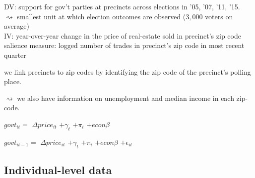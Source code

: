 \documentclass[10pt,aspectratio=169]{beamer}
\begin{document}
\begin{frame}
DV: support for gov't parties at precincts across elections in '05, '07, '11, '15. \\
$\rightsquigarrow$  smallest unit at which election outcomes are observed ($3,000$ voters on average) \\

\vspace{0.2in} \pause
IV: year-over-year change in the price of real-estate sold in precinct's zip code \\

\vspace{0.2in} \pause
salience measure: logged number of trades in precinct's zip code in most recent quarter

\pause

\vspace{0.2in}

we link precincts to zip codes by identifying the zip code of the precinct's polling place.

$\rightsquigarrow$  we also have information on unemployment and median income in each zip-code.



\end{frame}

\begin{frame} 
\begin{center}	
\huge{ \noindent $govt_{it}=$  $\Delta price_{it} $ \only<1>{$+ \epsilon_{it}$} \pause $+ \gamma_t$  \pause $+ \pi_i$  \pause  $+ econ \beta$  \pause

\vspace{0.2in}
\noindent $govt_{it-1}=$  $\Delta price_{it} $ $+ \gamma_t$ $+ \pi_i$  $+ econ \beta$ $+ \epsilon_{it}$
}
\end{center}
\end{frame}

\subsection{Individual-level data}

%
%
%
%
\end{document}
